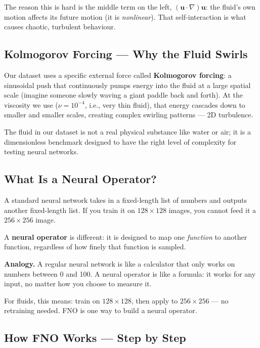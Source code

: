 \documentclass[11pt,twocolumn]{article}
\begin{document}
The reason this is hard is the middle term on the left, $(\mathbf{u} \cdot
\nabla)\mathbf{u}$: the fluid's own motion affects its future motion (it is
\emph{nonlinear}).
That self-interaction is what causes chaotic, turbulent behaviour.

\subsection{Kolmogorov Forcing --- Why the Fluid Swirls}

Our dataset uses a specific external force called \textbf{Kolmogorov forcing}:
a sinusoidal push that continuously pumps energy into the fluid at a
large spatial scale (imagine someone slowly waving a giant paddle back and
forth).
At the viscosity we use ($\nu = 10^{-4}$, i.e., very thin fluid), that energy
cascades down to smaller and smaller scales, creating complex swirling patterns
--- 2D turbulence.

The fluid in our dataset is not a real physical substance like water or air; it
is a dimensionless benchmark designed to have the right level of complexity for
testing neural networks.

\subsection{What Is a Neural Operator?}

A standard neural network takes in a fixed-length list of numbers and outputs
another fixed-length list.
If you train it on $128 \times 128$ images, you cannot feed it a $256 \times
256$ image.

A \textbf{neural operator} is different: it is designed to map one
\emph{function} to another function, regardless of how finely that function is
sampled.

\begin{analogybox}
\textbf{Analogy.}
A regular neural network is like a calculator that only works on numbers between
0 and 100.
A neural operator is like a formula: it works for any input, no matter how you
choose to measure it.
\end{analogybox}

For fluids, this means: train on $128 \times 128$, then apply to $256 \times
256$ --- no retraining needed.
FNO is one way to build a neural operator.

\subsection{How FNO Works --- Step by Step}
\end{document}
